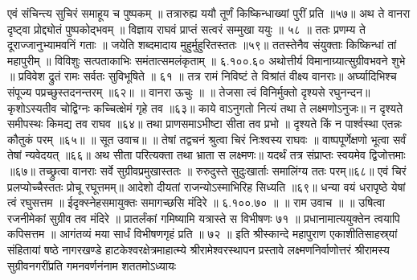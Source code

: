 एवं संचिन्त्य सुचिरं समाहूय च पुष्पकम् ॥
तत्रारुह्य ययौ तूर्णं किष्किन्धाख्यां पुरीं प्रति ॥५७॥
अथ ते वानरा दृष्ट्वा प्रोद्द्योतं पुष्पकोद्भवम् ॥
विज्ञाय राघवं प्राप्तं सत्वरं सम्मुखा ययुः ॥ ५८ ॥
ततः प्रणम्य ते दूराज्जानुभ्यामवनिं गताः ॥
जयेति शब्दमादाय मुहुर्मुहुरितस्ततः ॥५९॥
ततस्तेनैव संयुक्ताः किष्किन्धां तां महापुरीम् ॥
विविशुः सत्पताकाभिः समंतात्समलंकृताम् ॥ ६.१००.६०
अथोत्तीर्य विमानाग्र्यात्सुग्रीवभवने शुभे ॥
प्रविवेश द्रुतं रामः सर्वतः सुविभूषिते ॥ ६१ ॥
तत्र रामं निविष्टं ते विश्रांतं वीक्ष्य वानराः॥
अर्घ्यादिभिश्च संपूज्य पप्रच्छुस्तदनन्तरम् ॥६२॥
॥ वानरा ऊचुः ॥ ॥
तेजसा त्वं विनिर्मुक्तो दृश्यसे रघुनन्दन॥
कृशोऽस्यतीव चोद्विग्नः कच्चित्क्षेमं गृहे तव ॥६३॥
काये वाऽनुगतो नित्यं तथा ते लक्ष्मणोऽनुजः॥
न दृश्यते समीपस्थः किमद्य तव राघव ॥६४॥
तथा प्राणसमाऽभीष्टा सीता तव प्रभो ॥
दृश्यते किं न पार्श्वस्था एतन्नः कौतुकं परम् ॥६५॥
॥ सूत उवाच॥ ॥
तेषां तद्वचनं श्रुत्वा चिरं निःश्वस्य राघवः ॥
वाष्पपूर्णेक्षणो भूत्वा सर्वं तेषां न्यवेदयत् ॥६६॥
अथ सीता परित्यक्ता तथा भ्राता स लक्ष्मणः॥
यदर्थं तत्र संप्राप्तः स्वयमेव द्विजोत्तमाः ॥६७॥
तच्छ्रुत्वा वानराः सर्वे सुग्रीवप्रमुखास्ततः ॥
रुरुदुस्ते सुदुःखार्ताः समालिंग्य ततः परम्॥६८॥
एवं चिरं प्रलप्योच्चैस्ततः प्रोचू रघूत्तमम्॥
आदेशो दीयतां राजन्योऽस्माभिरिह सिध्यति ॥६९॥
धन्या वयं धरापृष्ठे येषां त्वं रघुसत्तम ॥
ईदृक्स्नेहसमायुक्तः समागच्छसि मंदिरे ॥ ६.१००.७० ॥
॥ राम उवाच ॥ ॥
उषित्वा रजनीमेकां सुग्रीव तव मंदिरे ॥
प्रातर्लंकां गमिष्यामि यत्रास्ते स विभीषणः ७१ ॥
प्रधानामात्ययुक्तेन त्वयापि कपिसत्तम ॥
आगंतव्यं मया सार्धं विभीषणगृहं प्रति ॥ ७२ ॥
इति श्रीस्कान्दे महापुराण एकाशीतिसाहस्र्यां संहितायां षष्ठे नागरखण्डे हाटकेश्वरक्षेत्रमाहात्म्ये श्रीरामेश्वरस्थापन प्रस्तावे लक्ष्मणनिर्वाणोत्तरं श्रीरामस्य सुग्रीवनगरींप्रति गमनवर्णनंनाम शततमोऽध्यायः

